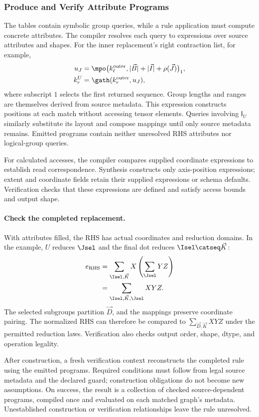 \subsubsection{Produce and Verify Attribute Programs}
\label{extended:sec:emit-programs}
The tables contain symbolic group queries, while a rule application must
compute concrete attributes. The compiler resolves each query to expressions
over source attributes and shapes. For the inner replacement's right
contraction list, for example,
\begin{equation}
\begin{aligned}
 u_J&=\mpo\bigl(k_\ell^{\mathrm{outer}},
                   |\vec B|+|\vec I|+\rho(\vec J)\bigr)_1,\\
 k_r^U&=\gath(k_r^{\mathrm{outer}},u_J),
\end{aligned}
\label{extended:eq:source-only-example}
\end{equation}
where subscript $1$ selects the first returned sequence. Group lengths and
ranges are themselves derived from source metadata. This expression constructs
positions at each match without accessing tensor elements. Queries involving
$\mathsf{I}_U$ similarly substitute its layout and compose mappings until only source
metadata remains. Emitted programs contain neither unresolved RHS attributes
nor logical-group queries.

For calculated accesses, the compiler compares supplied coordinate
expressions to establish read correspondence. Synthesis constructs only
axis-position expressions; extent and coordinate fields retain their
supplied expressions or schema defaults. Verification checks that these
expressions are defined and satisfy access bounds and output shape.

\paragraph{Check the completed replacement.}
With attributes filled, the RHS has actual coordinates and reduction domains.
In the example, $U$ reduces $\Jsel$ and the final dot reduces
$\Isel\catseq \vec K$:
\begin{equation}
\begin{aligned}
 e_{\mathrm{RHS}}
 &=\sum_{\Isel,\vec K}X\left(\sum_{\Jsel}YZ\right)\\
 &=\sum_{\Isel,\vec K,\Jsel}XYZ.
\end{aligned}
\end{equation}
The selected subgroups partition $\vec D$, and the mappings preserve coordinate
pairing. The normalized RHS can therefore be compared to
$\sum_{\vec D,\vec K}XYZ$ under the permitted reduction laws. Verification also checks
output order, shape, dtype, and operation legality.

After construction, a fresh verification context reconstructs the completed
rule using the emitted programs. Required conditions must follow from legal
source metadata and the declared guard; construction obligations do not
become new assumptions. On success, the result is a collection of checked
source-dependent programs, compiled once and evaluated on each matched
graph's metadata. Unestablished construction or verification relationships
leave the rule unresolved.
